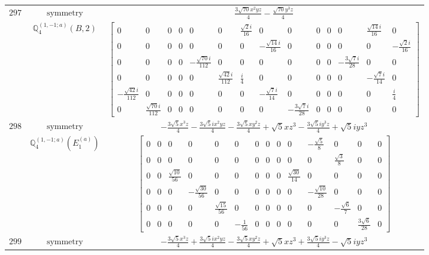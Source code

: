 \documentclass[fleqn,8pt,landscape]{jsarticle}
\begin{document}
\begin{longtable}{ccc}
$ 297 $ & $ \text{symmetry} $ & $ \frac{3 \sqrt{70} x^{2} y z}{4} - \frac{\sqrt{70} y^{3} z}{4} $ \\
$  $ & $ \mathbb{Q}_{4}^{(1,-1;a)}(B,2) $ & $ \begin{bmatrix} 0 & 0 & 0 & 0 & 0 & 0 & \frac{\sqrt{2} i}{16} & 0 & 0 & 0 & 0 & 0 & \frac{\sqrt{14} i}{16} & 0 \\ 0 & 0 & 0 & 0 & 0 & 0 & 0 & - \frac{\sqrt{14} i}{16} & 0 & 0 & 0 & 0 & 0 & - \frac{\sqrt{2} i}{16} \\ 0 & 0 & 0 & 0 & - \frac{\sqrt{70} i}{112} & 0 & 0 & 0 & 0 & 0 & 0 & - \frac{3 \sqrt{7} i}{28} & 0 & 0 \\ 0 & 0 & 0 & 0 & 0 & \frac{\sqrt{42} i}{112} & \frac{i}{4} & 0 & 0 & 0 & 0 & 0 & - \frac{\sqrt{7} i}{14} & 0 \\ - \frac{\sqrt{42} i}{112} & 0 & 0 & 0 & 0 & 0 & 0 & - \frac{\sqrt{7} i}{14} & 0 & 0 & 0 & 0 & 0 & \frac{i}{4} \\ 0 & \frac{\sqrt{70} i}{112} & 0 & 0 & 0 & 0 & 0 & 0 & - \frac{3 \sqrt{7} i}{28} & 0 & 0 & 0 & 0 & 0 \end{bmatrix} $ \\ \hline
$ 298 $ & $ \text{symmetry} $ & $ - \frac{3 \sqrt{5} x^{3} z}{4} - \frac{3 \sqrt{5} i x^{2} y z}{4} - \frac{3 \sqrt{5} x y^{2} z}{4} + \sqrt{5} x z^{3} - \frac{3 \sqrt{5} i y^{3} z}{4} + \sqrt{5} i y z^{3} $ \\
$  $ & $ \mathbb{Q}_{4}^{(1,-1;a)}(E_{1}^{(a)}) $ & $ \begin{bmatrix} 0 & 0 & 0 & 0 & 0 & 0 & 0 & 0 & 0 & 0 & - \frac{\sqrt{5}}{8} & 0 & 0 & 0 \\ 0 & 0 & 0 & 0 & 0 & 0 & 0 & 0 & 0 & 0 & 0 & \frac{\sqrt{3}}{8} & 0 & 0 \\ 0 & 0 & \frac{\sqrt{10}}{56} & 0 & 0 & 0 & 0 & 0 & 0 & \frac{\sqrt{30}}{14} & 0 & 0 & 0 & 0 \\ 0 & 0 & 0 & - \frac{\sqrt{30}}{56} & 0 & 0 & 0 & 0 & 0 & 0 & - \frac{\sqrt{10}}{28} & 0 & 0 & 0 \\ 0 & 0 & 0 & 0 & \frac{\sqrt{15}}{56} & 0 & 0 & 0 & 0 & 0 & 0 & - \frac{\sqrt{6}}{7} & 0 & 0 \\ 0 & 0 & 0 & 0 & 0 & - \frac{1}{56} & 0 & 0 & 0 & 0 & 0 & 0 & \frac{3 \sqrt{6}}{28} & 0 \end{bmatrix} $ \\ \hline
$ 299 $ & $ \text{symmetry} $ & $ - \frac{3 \sqrt{5} x^{3} z}{4} + \frac{3 \sqrt{5} i x^{2} y z}{4} - \frac{3 \sqrt{5} x y^{2} z}{4} + \sqrt{5} x z^{3} + \frac{3 \sqrt{5} i y^{3} z}{4} - \sqrt{5} i y z^{3} $ \\

\end{longtable}
\end{document}
